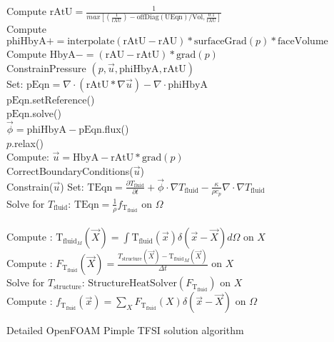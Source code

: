 \documentclass[10pt]{article} %
\begin{document}
\begin{algorithm}[H]
{{{				
				{
					Compute $\text{rAtU} =  \frac{1}{max\left[(\frac{1}{\text{rAU}}) - \text{offDiag}(\text{UEqn})/\text{Vol} , \frac{0.1}{\text{rAU}}\right]} $\\
					Compute $\text{phiHbyA} += \text{interpolate}(\text{rAtU}-\text{rAU})*\text{surfaceGrad}(p)*\text{faceVolume}$\\
					Compute $\text{HbyA} -=  \left(\text{rAU}-\text{rAtU}\right)*\text{grad}(p)$\\
				}
				ConstrainPressure $(p,\vec{u},\text{phiHbyA},\text{rAtU})$\\
				{
					Set: $\text{pEqn} = \nabla \cdot \left(\text{rAtU} * \nabla \vec{u}\right)-\nabla \cdot \text{phiHbyA}$\\
					$\text{pEqn}.$setReference()\\
					$\text{pEqn}.$solve()\\
				}
				{
					$\vec{\phi} = \text{phiHbyA} - \text{pEqn}$.flux()\\
				}
				$p.$relax()\\
				Compute: $\vec{u} = \text{HbyA} - \text{rAtU}*\text{grad}(p)$\\
				CorrectBoundaryConditions($\vec{u}$)\\
				Constrain($\vec{u}$)
			}
		}
		{
			Set: $\text{TEqn} = \frac{\partial T_{\text{fluid}}}{\partial t} + \vec{\phi} \cdot \nabla T_{\text{fluid}} - \frac{\kappa}{\rho c_p} \nabla \cdot \nabla T_{\text{fluid}}$\\
			Solve for $T_{\text{fluid}}$: $\text{TEqn} = \frac{1}{\rho}f_{\text{T}_{\text{fluid}}}$ \quad on $\Omega$\\
			\quad \\
			Compute : $\text{T}_{\text{fluid}_M} (\vec{X}) = \int {\text{T}_{\text{fluid}}}(\vec{x}) \delta(\vec{x}-\vec{X}) d \Omega$  \quad on $X$\\
			Compute : $F_{\text{T}_{\text{fluid}}} (\vec{X}) = \frac{T_{\text{structure}} (\vec{X}) - {\text{T}_{\text{fluid}}}_M(\vec{X})}{\Delta t}$ \quad on $X$\\
			Solve for $T_\text{structure}$: $\text{StructureHeatSolver}(F_{\text{T}_{\text{fluid}}})$ \quad on $X$\\
			Compute : $f_{\text{T}_{\text{fluid}}} (\vec{x}) = \sum_{X} F_{\text{T}_{\text{fluid}}} (X) \delta (\vec{x}-\vec{X})$ \quad on $\Omega$\\
		}
	}
	\caption{Detailed OpenFOAM Pimple TFSI solution algorithm}
\end{algorithm}
\end{document}
